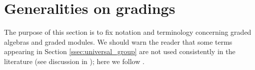 \chapter{Generalities on gradings}\label{sec:generalities}


The purpose of this section is to fix notation and terminology concerning graded algebras and graded modules. We should warn the reader that some terms appearing in Section \ref{ssec:universal_group} are not used consistently in the literature (see discussion in \cite[\S 2.7]{GS}); here we follow \cite{livromicha}.








